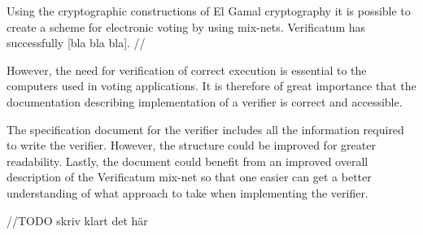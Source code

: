 Using the cryptographic constructions of El Gamal cryptography it is
possible to create a scheme for electronic voting by using
mix-nets. Verificatum has successfully [bla bla bla].
//

However, the need for verification of correct execution is essential
to the computers used in voting applications. It is therefore of great
importance that the documentation describing implementation of a
verifier is correct and accessible.

The specification document for the verifier includes all the
information required to write the verifier. However, the structure
could be improved for greater readability. Lastly, the document could
benefit from an improved overall description of the Verificatum
mix-net so that one easier can get a better understanding of what
approach to take when implementing the verifier.

//TODO skriv klart det här
